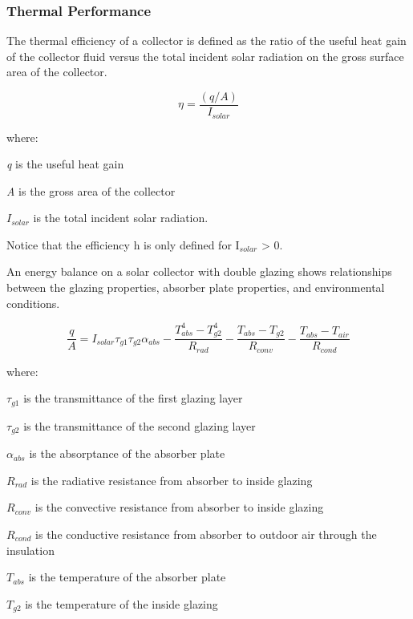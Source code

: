 \subsubsection{Thermal Performance}\label{thermal-performance}

The thermal efficiency of a collector is defined as the ratio of the useful heat gain of the collector fluid versus the total incident solar radiation on the gross surface area of the collector.

\begin{equation}
\eta  = \frac{{(q/A)}}{{{I_{solar}}}}
\label{eq:SolarCollectorEta}
\end{equation}

where:

\emph{q} is the useful heat gain

\emph{A} is the gross area of the collector

\(I_{solar}\) is the total incident solar radiation.

Notice that the efficiency h is only defined for I\(_{solar}\) \textgreater{} 0.

An energy balance on a solar collector with double glazing shows relationships between the glazing properties, absorber plate properties, and environmental conditions.

\begin{equation}
\frac{q}{A} = {I_{solar}}{\tau_{g1}}{\tau_{g2}}{\alpha_{abs}} - \frac{{T_{abs}^4 - T_{g2}^4}}{{{R_{rad}}}} - \frac{{{T_{abs}} - {T_{g2}}}}{{{R_{conv}}}} - \frac{{{T_{abs}} - {T_{air}}}}{{{R_{cond}}}}
\end{equation}

where:

\(\tau_{g1}\) is the transmittance of the first glazing layer

\(\tau_{g2}\) is the transmittance of the second glazing layer

\(\alpha_{abs}\) is the absorptance of the absorber plate

\(R_{rad}\) is the radiative resistance from absorber to inside glazing

\(R_{conv}\) is the convective resistance from absorber to inside glazing

\(R_{cond}\) is the conductive resistance from absorber to outdoor air through the insulation

\(T_{abs}\) is the temperature of the absorber plate

\(T_{g2}\) is the temperature of the inside glazing

